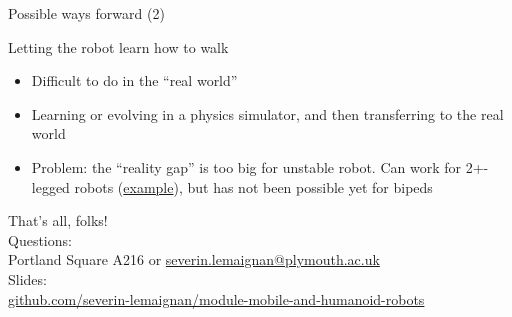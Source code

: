 \documentclass[compress]{beamer}
\begin{document}
\begin{frame}{Possible ways forward (2)}

    Letting the robot learn how to walk

    \begin{itemize}

        \item Difficult to do in the ``real world''
        \item Learning or evolving in a physics simulator, and then transferring to
            the real world
        \item Problem: the ``reality gap'' is too big for unstable robot. Can work
            for 2+-legged robots
            (\href{https://www.youtube.com/watch?v=V2ADU8YWIug}{example}), but has
            not been possible yet for bipeds
    \end{itemize}

\end{frame}

\begin{frame}{}
    \begin{center}
        \Large
        That's all, folks!\\[2em]
        \normalsize
        Questions:\\
        Portland Square A216 or \url{severin.lemaignan@plymouth.ac.uk} \\[1em]

        Slides:\\ \href{https://github.com/severin-lemaignan/module-mobile-and-humanoid-robots}{\small github.com/severin-lemaignan/module-mobile-and-humanoid-robots}

    \end{center}
\end{frame}
\end{document}
